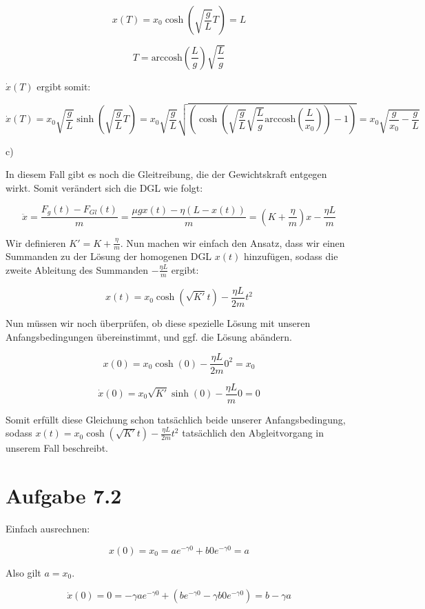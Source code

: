 \documentclass{theozettel}
\begin{document}
$$
x(T) =  x_0 \cosh(\sqrt{\frac{g}{L}} T) = L
$$

$$
T = \text{arccosh}(\frac{L}{g}) \sqrt{\frac{L}{g}}
$$

$\dot{x}(T)$ ergibt somit:

$$
\dot{x}(T) = x_0 \sqrt{\frac{g}{L}} \sinh(\sqrt{\frac{g}{L}} T) = x_0 \sqrt{\frac{g}{L}} \sqrt{(\cosh( \sqrt{\frac{g}{L}} \sqrt{\frac{L}{g}} \text{arccosh}(\frac{L}{x_0})) - 1)} = x_0 \sqrt{\frac{g}{x_0} - \frac{g}{L}}
$$

c) 

In diesem Fall gibt es noch die Gleitreibung, die der Gewichtskraft entgegen wirkt. Somit verändert sich die DGL wie folgt:

$$
\ddot{x} = \frac{F_g(t) - F_{Gl}(t)}{m} = \frac{\mu g x(t) - \eta (L-x(t))}{m} = (K + \frac{\eta}{m}) x - \frac{\eta L}{m}
$$

Wir definieren $K' = K + \frac{\eta}{m}$. Nun machen wir einfach den Ansatz, dass wir einen Summanden zu der Lösung der homogenen DGL $x(t)$ hinzufügen, sodass die zweite Ableitung des Summanden $- \frac{\eta L}{m}$ ergibt:

$$
x(t) = x_0 \cosh(\sqrt{K'} t) - \frac{\eta L}{2 m} t^{2}
$$

Nun müssen wir noch überprüfen, ob diese spezielle Lösung mit unseren Anfangsbedingungen übereinstimmt, und ggf. die Lösung abändern.

$$
x(0) = x_0 \cosh(0) - \frac{\eta L}{2 m} 0^{2} = x_0
$$

$$
\dot{x}(0) = x_0 \sqrt{K'} \sinh(0) - \frac{\eta L}{m} 0 = 0
$$

Somit erfüllt diese Gleichung schon tatsächlich beide unserer Anfangsbedingung, sodass $x(t) = x_0 \cosh(\sqrt{K'} t) - \frac{\eta L}{2 m} t^{2}$ tatsächlich den Abgleitvorgang in unserem Fall beschreibt.


\section*{Aufgabe 7.2} 


Einfach ausrechnen:

$$
x(0) = x_0 = a e^{- \gamma 0} + b 0 e^{- \gamma 0} = a
$$

Also gilt $a = x_0$.

$$
\dot{x}(0) = 0 = - \gamma a e^{- \gamma 0} + (b e^{- \gamma 0} - \gamma b 0 e^{- \gamma 0}) = b - \gamma a
$$
\end{document}
